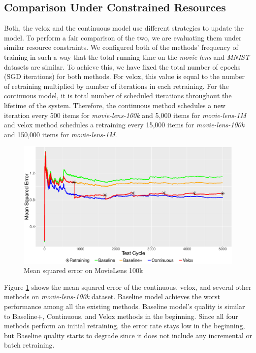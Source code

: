 \documentclass{vldb}
\begin{document}
\subsection{Comparison Under Constrained Resources }
Both, the velox and the continuous model use different strategies to update the model.
To perform a fair comparison of the two, we are evaluating them under similar resource constraints.
We configured both of the methods' frequency of training in such a way that the total running time on the \textit{movie-lens} and \textit{MNIST} datasets are similar.
To achieve this, we have fixed the total number of epochs (SGD iterations) for both methods.
For velox, this value is equal to the number of retraining multiplied by number of iterations in each retraining. 
For the continuous model, it is total number of scheduled iterations throughout the lifetime of the system.
Therefore, the continuous method schedules a new iteration every 500 items for \textit{movie-lens-100k} and 5,000 items for \textit{movie-lens-1M} and velox method schedules a retraining every 15,000 items for \textit{movie-lens-100k} and 150,000 items for \textit{movie-lens-1M}.
\begin{figure}[h]
\centering
\includegraphics[width=\columnwidth]{../images/experiment-results/movie-lens-100k-quality-improved.eps}
\caption{Mean squared error on MovieLens 100k}
\label{fig:movie-lens-100k-score}
\end{figure}
Figure \ref{fig:movie-lens-100k-score} shows the mean squared error of the continuous, velox, and several other methods on \textit{movie-lens-100k} dataset.
Baseline model achieves the worst performance among all the existing methods.
Baseline model's quality is similar to Baseline+, Continuous, and Velox methods in the beginning. 
Since all four methods perform an initial retraining, the error rate stays low in the beginning, but Baseline quality starts to degrade since it does not include any incremental or batch retraining.
\end{document}
